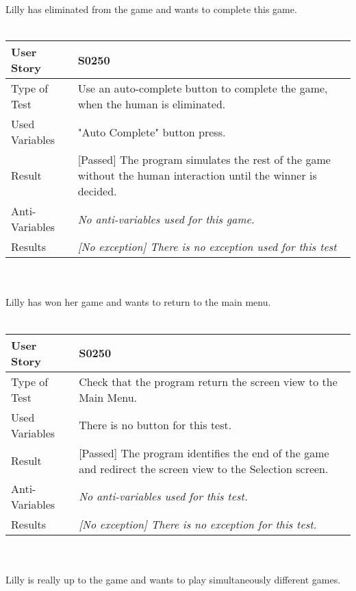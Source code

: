 Lilly has eliminated from the game and wants to complete this game.\\
\vspace{0.2cm}\\  
\begin{tabular}{l | p{12cm}}
User Story & \textbf{S0250}\\ \hline
Type of Test & Use an auto-complete button to complete the game, when the human is eliminated.\\ \hline
Used Variables & "Auto Complete" button press.\\ \hline
Result & [Passed] The program simulates the rest of the game without the human interaction until the winner is decided.\\ \hline
Anti-Variables & \emph{No anti-variables used for this game.}\\ \hline
Results & \emph{[No exception] There is no exception used for this test}\\ \hline
\end{tabular}\\
\vspace{0.2cm}\\
Lilly has won her game and wants to return to the main menu.\\
\vspace{0.2cm}\\  
\begin{tabular}{l | p{12cm}}
User Story & \textbf{S0250}\\ \hline
Type of Test & Check that the program return the screen view to the Main Menu.\\ \hline
Used Variables & There is no button for this test.\\ \hline
Result & [Passed] The program identifies the end of the game and redirect the screen view to the Selection screen.\\ \hline
Anti-Variables & \emph{No anti-variables used for this test.}\\ \hline
Results & \emph{[No exception] There is no exception for this test.}\\ \hline
\end{tabular}\\
\vspace{0.2cm}\\
Lilly is really up to the game and wants to play simultaneously different games.\\
\vspace{0.2cm}\\  
